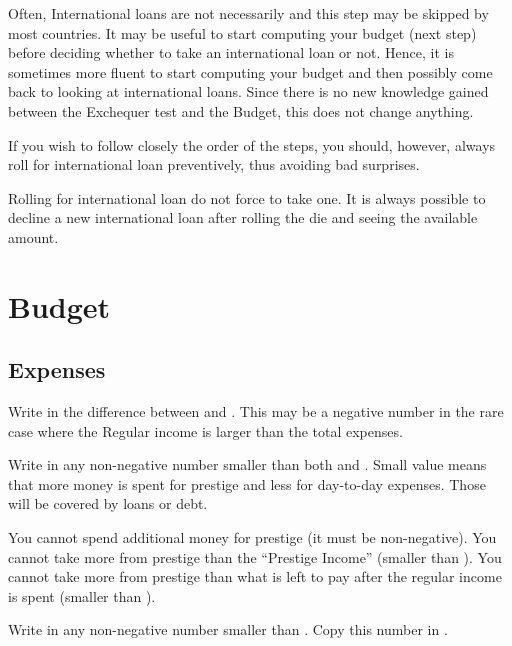 \begin{playtip}
  Often, International loans are not necessarily and this step may be skipped
  by most countries. It may be useful to start computing your budget (next
  step) before deciding whether to take an international loan or not. Hence,
  it is sometimes more fluent to start computing your budget and then possibly
  come back to looking at international loans. Since there is no new knowledge
  gained between the Exchequer test and the Budget, this does not change
  anything.

  If you wish to follow closely the order of the steps, you should, however,
  always roll for international loan preventively, thus avoiding bad
  surprises.

  Rolling for international loan do not force to take one. It is always
  possible to decline a new international loan after rolling the die and
  seeing the available amount.
\end{playtip}

\section{Budget}\label{chPeace:Budget}
\subsection{Expenses}
 Write in  the
difference between  and .
\bparag This may be a negative number in the rare case where the Regular
income is larger than the total expenses.

 Write in  any non-negative
number smaller than both  and
.
\bparag Small value means that more money is spent for prestige \VPs and less
for day-to-day expenses. Those will be covered by loans or debt.

\begin{designnote}
  You cannot spend additional money for prestige (it must be non-negative).
  You cannot take more from prestige than the ``Prestige Income'' (smaller
  than ).  You cannot take more from prestige
  than what is left to pay after the regular income is spent (smaller than
  ).
\end{designnote}

 Write in  any non-negative
number smaller than .
\bparag Copy this number in .

